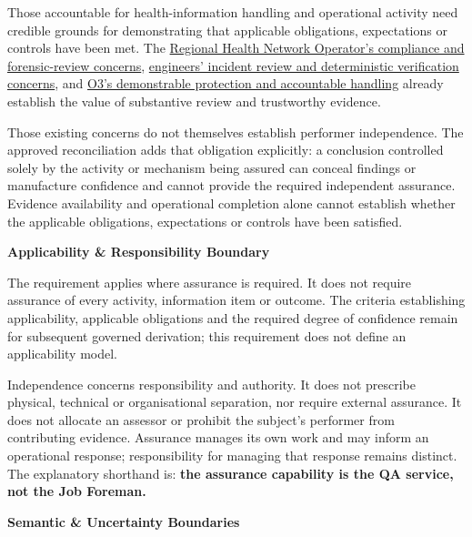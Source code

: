 Those accountable for health-information handling and operational activity need credible grounds for demonstrating that applicable obligations, expectations or controls have been met. The \hyperref[element:e76216c494fa4500bb80eda6f83513c1]{Regional Health Network Operator's compliance and forensic-review concerns}, \hyperref[element:c20aa17ce4aa4a58be5eb3cff2ecdd1d]{engineers' incident review and deterministic verification concerns}, and \hyperref[element:75519ed8f7de4a619cc9065f525d703a]{O3's demonstrable protection and accountable handling} already establish the value of substantive review and trustworthy evidence.



Those existing concerns do not themselves establish performer independence. The approved reconciliation adds that obligation explicitly: a conclusion controlled solely by the activity or mechanism being assured can conceal findings or manufacture confidence and cannot provide the required independent assurance. Evidence availability and operational completion alone cannot establish whether the applicable obligations, expectations or controls have been satisfied.



\par\medskip\textbf{Applicability \& Responsibility Boundary}\par


The requirement applies where assurance is required. It does not require assurance of every activity, information item or outcome. The criteria establishing applicability, applicable obligations and the required degree of confidence remain for subsequent governed derivation; this requirement does not define an applicability model.



Independence concerns responsibility and authority. It does not prescribe physical, technical or organisational separation, nor require external assurance. It does not allocate an assessor or prohibit the subject's performer from contributing evidence. Assurance manages its own work and may inform an operational response; responsibility for managing that response remains distinct. The explanatory shorthand is: \textbf{the assurance capability is the QA service, not the Job Foreman.}



\par\medskip\textbf{Semantic \& Uncertainty Boundaries}\par


